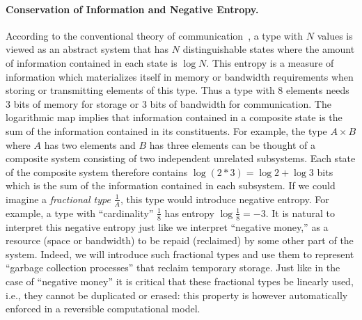 \documentclass[sigplan,10pt,review,anonymous]{acmart}
\begin{document}
\paragraph*{Conservation of Information and Negative Entropy.}  
According to the conventional theory of
communication~\cite{Shannon1948}, a type with $N$ values is viewed as
an abstract system that has $N$ distinguishable states where the
amount of information contained in each state is $\log{N}$. This
entropy is a measure of information which materializes itself in
memory or bandwidth requirements when storing or transmitting elements
of this type. Thus a type with 8 elements needs 3 bits of memory for
storage or 3 bits of bandwidth for communication. The logarithmic map
implies that information contained in a composite state is the sum of
the information contained in its constituents. For example, the type
$A \times B$ where $A$ has two elements and $B$ has three elements can
be thought of a composite system consisting of two independent
unrelated subsystems.  Each state of the composite system therefore
contains $\log{(2*3)} = \log{2} + \log{3}$ bits which is the sum of
the information contained in each subsystem. If we could imagine a
\emph{fractional type} $\frac{1}{A}$, this type would introduce
negative entropy. For example, a type with ``cardinality''
$\frac{1}{8}$ has entropy $\log{\frac{1}{8}} = -3$. It is natural to
interpret this negative entropy just like we interpret ``negative
money,'' as a resource (space or bandwidth) to be repaid (reclaimed)
by some other part of the system. Indeed, we will introduce such
fractional types and use them to represent ``garbage collection
processes'' that reclaim temporary storage. Just like in the case of
``negative money'' it is critical that these fractional types be
linearly used, i.e., they cannot be duplicated or erased: this
property is however automatically enforced in a reversible
computational model.
\end{document}
